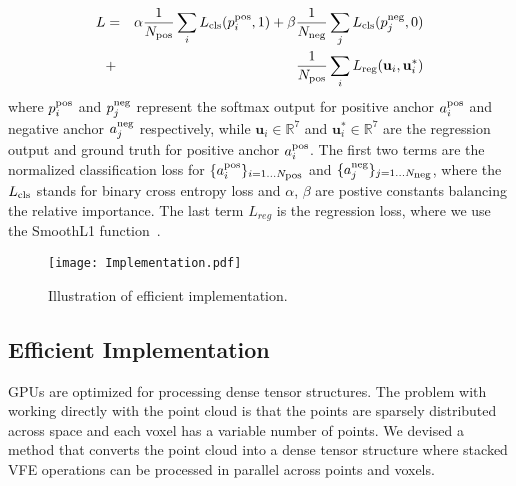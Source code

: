 \documentclass[10pt,twocolumn,letterpaper]{article}
\begin{document}
\begin{eqnarray}
    L & = & \alpha\frac{1}{N_{\text{\scriptsize pos}}} \sum\limits_{i} L_{\text{\scriptsize cls}}(p^{\text{\scriptsize pos}}_i, 1) + 
            \beta\frac{1}{N_{\text{\scriptsize neg}}} \sum\limits_{j} L_{\text{\scriptsize cls}}(p^{\text{\scriptsize neg}}_j, 0) \nonumber \\
            & + & \frac{1}{N_{\text{\scriptsize pos}}} \sum\limits_{i} L_{\text{\scriptsize reg}}(\mathbf{u}_i, \mathbf{u}_i^*)
\label{eqn:loss_function}
\end{eqnarray}
where $p^{\text{\scriptsize pos}}_i$ and $p^{\text{\scriptsize neg}}_j$ represent the softmax output for positive anchor $a^{\text{\scriptsize pos}}_i$ and negative anchor $a^{\text{\scriptsize neg}}_j$ respectively, while $\mathbf{u}_i \in \mathbb{R}^7$ and $\mathbf{u}_i^* \in \mathbb{R}^7$ are the regression output and ground truth for positive anchor $a^{\text{\scriptsize pos}}_i$. The first two terms are the normalized classification loss for $\{ a^{\text{\scriptsize pos}}_i \}_{i=1 \ldots N_{\text{\scriptsize pos}}}$ and $\{ a^{\text{\scriptsize neg}}_j \}_{j=1 \ldots N_{\text{\scriptsize neg}}}$, where the $L_{\text{\scriptsize cls}}$ stands for binary cross entropy loss and $\alpha$, $\beta$ are postive constants balancing the relative importance. The last term $L_{reg}$ is the regression loss, where we use the SmoothL1 function~\cite{REF:Girshick:2015,REF:NIPS2015_5638}.




\begin{figure}[!t]
\centering
    \texttt{[image: Implementation.pdf]}
\caption{Illustration of efficient implementation.}
\vspace{-0.3cm}
\label{fig:Implementation}
\end{figure}


\subsection{Efficient Implementation}
\label{subsec:implementation}




GPUs are optimized for processing dense tensor structures. The problem with working directly with the point cloud is that the points are sparsely distributed across space and each voxel has a variable number of points.  We devised a method that converts the point cloud into a dense tensor structure where stacked VFE operations can be processed in parallel  across points and voxels. 
\end{document}
